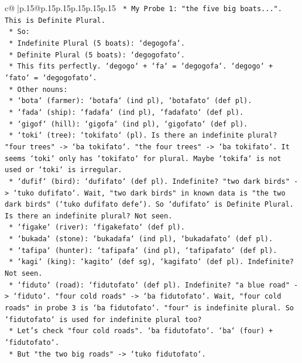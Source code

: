 \documentclass{article}
\begin{document}
{\begin{supertabular}{c@{$\;$}|p{.15\linewidth}@{}p{.15\linewidth}p{.15\linewidth}p{.15\linewidth}p{.15\linewidth}p{.15\linewidth}}
{{{\texttt{        *   My Probe 1: "the five big boats...". This is Definite Plural.} \\
\texttt{        *   So:} \\
\texttt{            *   Indefinite Plural (5 boats): `degogofa`.} \\
\texttt{            *   Definite Plural (5 boats): `degogofato`.} \\
\texttt{        *   This fits perfectly. `degogo` + `fa` = `degogofa`. `degogo` + `fato` = `degogofato`.} \\
\texttt{    *   Other nouns:} \\
\texttt{        *   `bota` (farmer): `botafa` (ind pl), `botafato` (def pl).} \\
\texttt{        *   `fada` (ship): `fadafa` (ind pl), `fadafato` (def pl).} \\
\texttt{        *   `gigof` (hill): `gigofa` (ind pl), `gigofato` (def pl).} \\
\texttt{        *   `toki` (tree): `tokifato` (pl). Is there an indefinite plural? "four trees" {-}> `ba tokifato`. "the four trees" {-}> `ba tokifato`. It seems `toki` only has `tokifato` for plural. Maybe `tokifa` is not used or `toki` is irregular.} \\
\texttt{        *   `dufif` (bird): `dufifato` (def pl). Indefinite? "two dark birds" {-}> `tuko dufifato`. Wait, "two dark birds" in known data is "the two dark birds" (`tuko dufifato defe`). So `dufifato` is Definite Plural. Is there an indefinite plural? Not seen.} \\
\texttt{        *   `figake` (river): `figakefato` (def pl).} \\
\texttt{        *   `bukada` (stone): `bukadafa` (ind pl), `bukadafato` (def pl).} \\
\texttt{        *   `tafipa` (hunter): `tafipafa` (ind pl), `tafipafato` (def pl).} \\
\texttt{        *   `kagi` (king): `kagito` (def sg), `kagifato` (def pl). Indefinite? Not seen.} \\
\texttt{        *   `fiduto` (road): `fidutofato` (def pl). Indefinite? "a blue road" {-}> `fiduto`. "four cold roads" {-}> `ba fidutofato`. Wait, "four cold roads" in probe 3 is `ba fidutofato`. "four" is indefinite plural. So `fidutofato` is used for indefinite plural too?} \\
\texttt{        *   Let's check "four cold roads". `ba fidutofato`. `ba` (four) + `fidutofato`.} \\
\texttt{        *   But "the two big roads" {-}> `tuko fidutofato`.} \\
}}}
\end{supertabular}}
\end{document}
